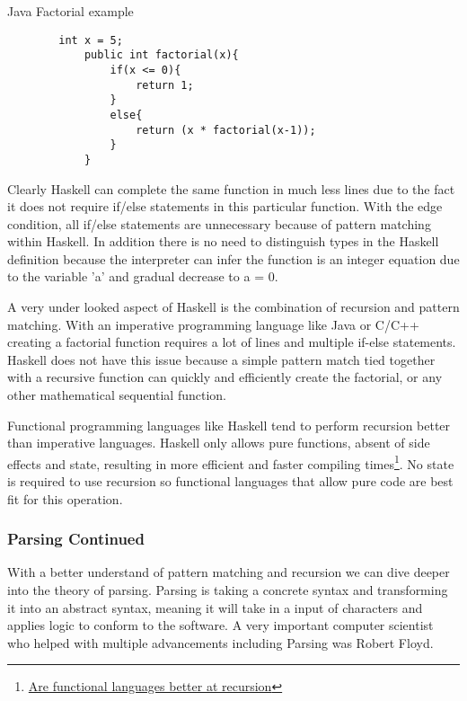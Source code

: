 \documentclass{article}
\begin{document}
        \medskip
        \caption{Java Factorial example}
        \begin{lstlisting}
        int x = 5;
            public int factorial(x){
                if(x <= 0){
                    return 1;
                }
                else{
                    return (x * factorial(x-1));
                }
            }
        \end{lstlisting}
        Clearly Haskell can complete the same function in much less lines due to the fact it does not require if/else statements in this particular function. With the edge condition, all if/else statements are unnecessary because of pattern matching within Haskell. In addition there is no need to distinguish types in the Haskell definition because the interpreter can infer the function is an integer equation due to the variable 'a' and gradual decrease to a = 0.
        
        \medskip
        \noindent A very under looked aspect of Haskell is the combination of recursion and pattern matching. With an imperative programming language like Java or C/C++ creating a factorial function requires a lot of lines and multiple if-else statements. Haskell does not have this issue because a simple pattern match tied together with a recursive function can quickly and efficiently create the factorial, or any other mathematical sequential function.
        
        \medskip
        \noindent Functional programming languages like Haskell tend to perform recursion better than imperative languages. Haskell only allows pure functions, absent of side effects and state, resulting in more efficient and faster compiling times\footnote{\href{https://softwareengineering.stackexchange.com/questions/149167/are-functional-languages-better-at-recursion}{Are functional languages better at recursion}}. No state is required to use recursion so functional languages that allow pure code are best fit for this operation.
        
        
        \subsubsection{Parsing Continued}
        With a better understand of pattern matching and recursion we can dive deeper into the theory of parsing. Parsing is taking a concrete syntax and transforming it into an abstract syntax, meaning it will take in a input of characters and applies logic to conform to the software. A very important computer scientist who helped with multiple advancements including Parsing was Robert Floyd.
        
\end{document}
